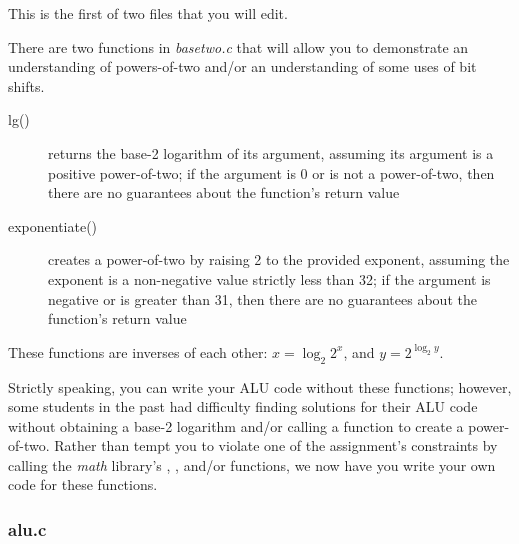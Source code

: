 This is the first of two files that you will edit.

There are two functions in \textit{basetwo.c} that will allow you to demonstrate an understanding of powers-of-two and/or an understanding of some uses of bit shifts.
\begin{description}
    \item[lg()] returns the base-2 logarithm of its argument, assuming its argument is a positive power-of-two;
        if the argument is 0 or is not a power-of-two, then there are no guarantees about the function's return value
    \item[exponentiate()] creates a power-of-two by raising 2 to the provided exponent, assuming the exponent is a non-negative value strictly less than 32;
        if the argument is negative or is greater than 31, then there are no guarantees about the function's return value
\end{description}
These functions are inverses of each other: $x = \log_2 2^x$, and $y = 2^{\log_2 y}$.

Strictly speaking, you can write your ALU code without these functions;
however, some students in the past had difficulty finding solutions for their ALU code without obtaining a base-2 logarithm and/or calling a function to create a power-of-two.
Rather than tempt you to violate one of the assignment's constraints by calling the \textit{math} library's , , and/or  functions, we now have you write your own code for these functions.

\subsubsection{alu.c}

